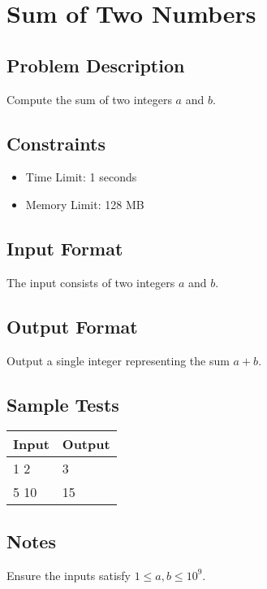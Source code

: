 \documentclass[a4paper]{article}
\begin{document}
\section*{Sum of Two Numbers}

\subsection*{Problem Description}
Compute the sum of two integers \(a\) and \(b\).

\subsection*{Constraints}
\begin{itemize}
  \item Time Limit: 1 seconds
  \item Memory Limit: 128 MB
\end{itemize}

\subsection*{Input Format}
The input consists of two integers \(a\) and \(b\).

\subsection*{Output Format}
Output a single integer representing the sum \(a + b\).

\subsection*{Sample Tests}
\begin{tabular}{|l|l|}
\hline
\textbf{Input} & \textbf{Output} \\ \hline
1 2 & 3 \\ \hline
5 10 & 15 \\ \hline
\end{tabular}

\subsection*{Notes}
Ensure the inputs satisfy \(1 \leq a, b \leq 10^9\).
\end{document}

